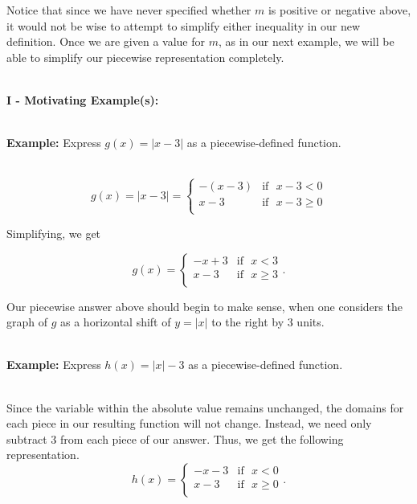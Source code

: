 \documentclass[12pt]{article}
\theoremstyle{definition}
\begin{document}
Notice that since we have never specified whether $m$ is positive or negative above, it would not be wise to attempt to simplify either inequality in our new definition.  Once we are given a value for $m$, as in our next example, we will be able to simplify our piecewise representation completely.\\
\ \par
{\bf I - Motivating Example(s):}\\
\ \par
{\bf Example:} Express $g(x) = |x-3|$ as a piecewise-defined function.\\
\ \par 
\[ g(x) = |x-3| =  \begin{cases} -(x-3)  & \text{if~~} x-3 < 0 \\ x-3 & \text{if~~} x-3 \geq 0 \\ \end{cases}\]

Simplifying, we get

\[ g(x) = \begin{cases} -x+3 & \text{if~~} x<3 \\ x-3 & \text{if~~} x \geq 3 \\ \end{cases}.\]

Our piecewise answer above should begin to make sense, when one considers the graph of $g$ as a horizontal shift of $y=|x|$ to the right by 3 units.\\
\ \par
{\bf Example:} Express $h(x) = |x|-3$ as a piecewise-defined function.\\
\ \par
Since the variable within the absolute value remains unchanged, the domains for each piece in our resulting function will not change.  Instead, we need only subtract $3$ from each piece of our answer.  Thus, we get the following representation.
\[ h(x) =\begin{cases} -x-3 & \text{if~~} x<0 \\ x-3  & \text{if~~} x \geq 0 \\ \end{cases}.\]
\end{document}
